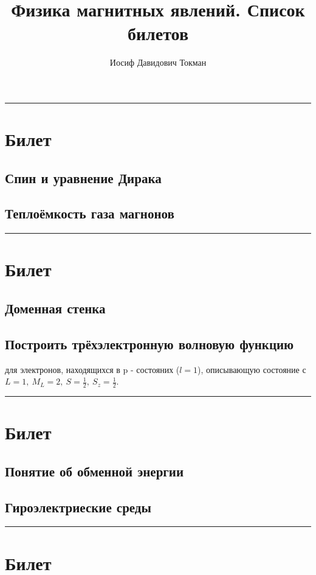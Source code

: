 \documentclass[a4paper, 14pt, russian]{article}
\title{Физика магнитных явлений. Список билетов}
\author{Иосиф Давидович Токман}
\date{}
\newcommand{\ihline}{\noindent\rule{\textwidth}{1pt}}
\begin{document}
	\maketitle

	\noindent\rule{\textwidth}{1pt}

	\section{Билет}
		\subsection{Спин и уравнение Дирака}
		\subsection{Теплоёмкость газа магнонов}

	\ihline

	\section{Билет}
		\subsection{Доменная стенка}
		\subsection{Построить трёхэлектронную волновую функцию}
		для электронов, находящихся в p - состояних ($l = 1$),
		описывающую состояние с 
		$L = 1,~M_L = 2,~S=\frac{1}{2},~S_z = \frac{1}{2}$.

	\ihline

	\section{Билет}
		\subsection{Понятие об обменной энергии}
		\subsection{Гироэлектриеские среды}

	\ihline

	\section{Билет}
\end{document}
